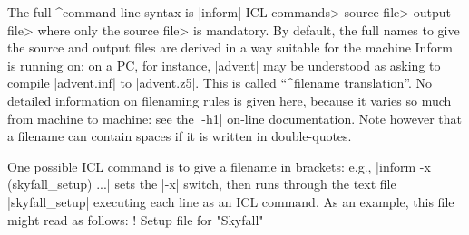 The full ^{command line syntax} is
\begindisplay
|inform| \<ICL commands> \<source file> \<output file>
\enddisplay
where only the \<source file> is mandatory.  By default, the full names to
give the source and output files are derived in a way suitable for the
machine Inform is running on: on a PC, for instance, |advent| may be
understood as asking to compile |advent.inf| to |advent.z5|.  This is called
``^{filename translation}''.  No detailed information on filenaming rules
is given here, because it varies so much from machine to machine: see the
|-h1| on-line documentation.  Note however that a filename can contain
spaces if it is written in double-quotes.

\bigskip\noindent
One possible ICL command is to give a filename in brackets: e.g.,
\begindisplay
|inform -x (skyfall_setup) ...|
\enddisplay
sets the |-x| switch, then runs through the text file |skyfall_setup|
executing each line as an ICL command.  As an example, this file might
read as follows:
\beginstt
   ! Setup file for "Skyfall"

